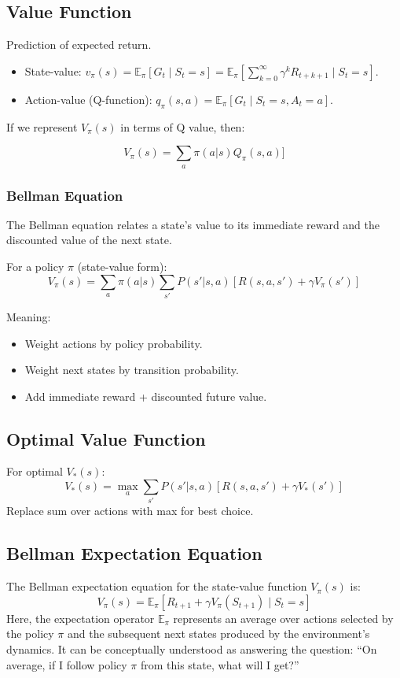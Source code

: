 \documentclass[12pt]{article}
\begin{document}
\subsection{Value Function}
Prediction of expected return.
\begin{itemize}
    \item State-value: $v_\pi(s) = \mathbb{E}_\pi[G_t \mid S_t = s] = \mathbb{E}_\pi[\sum_{k=0}^\infty \gamma^k R_{t+k+1} \mid S_t = s]$.
    \item Action-value (Q-function): $q_\pi(s,a) = \mathbb{E}_\pi[G_t \mid S_t = s, A_t = a]$.

\end{itemize}
    If we represent  $V_\pi(s)$ in terms of Q value, then:

    $$
    V_\pi(s) = \sum_a \pi(a|s) Q_\pi(s,a) ]
    $$

\subsubsection*{Bellman Equation}

The Bellman equation relates a state's value to its immediate reward and the discounted value of the next state.

For a policy $\pi$ (state-value form):
$$
V_\pi(s) = \sum_a \pi(a|s) \sum_{s'} P(s'|s,a) [ R(s,a,s') + \gamma V_\pi(s') ]
$$



Meaning:
\begin{itemize}
    \item Weight actions by policy probability.
    \item Weight next states by transition probability.
    \item Add immediate reward + discounted future value.
\end{itemize}

\subsection{Optimal Value Function}
For optimal $V_*(s)$:
$$
V_*(s) = \max_a \sum_{s'} P(s'|s,a) [ R(s,a,s') + \gamma V_*(s') ]
$$
Replace sum over actions with max for best choice.

\subsection{Bellman Expectation Equation}
The Bellman expectation equation for the state-value function $V_\pi(s)$ is:
$$
V_\pi(s) = \mathbb{E}_\pi [ R_{t+1} + \gamma V_\pi(S_{t+1}) \mid S_t=s ]
$$
Here, the expectation operator $\mathbb{E}_\pi$ represents an average over actions selected by the policy $\pi$ and the subsequent next states produced by the environment's dynamics. It can be conceptually understood as answering the question: ``On average, if I follow policy $\pi$ from this state, what will I get?''
\end{document}
